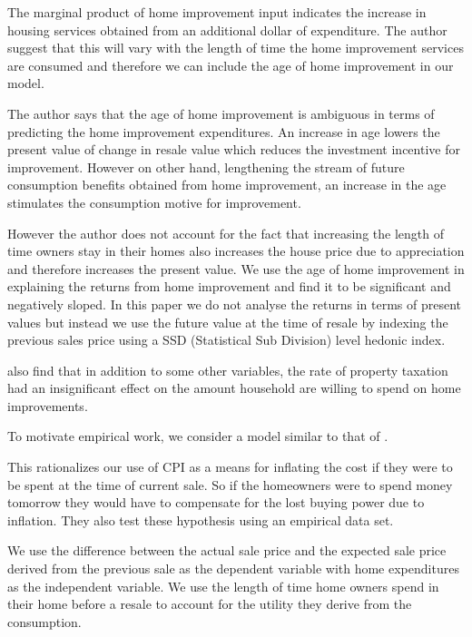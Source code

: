The marginal product of home improvement input indicates the increase in housing services obtained from an additional dollar of expenditure. The author suggest that this will vary with the length of time the home improvement services are consumed and therefore we can include the age of home improvement in our model.

The author says that the age of home improvement is ambiguous in terms of predicting the home improvement expenditures. An increase in age lowers the present value of change in resale value which reduces the investment incentive for improvement. However on other hand, lengthening the stream of future consumption benefits obtained from home improvement, an increase in the age stimulates the consumption motive for improvement.

However the author does not account for the fact that increasing the length of time owners stay in their homes also increases the house price due to appreciation and therefore increases the present value. We use the age of home improvement in explaining the returns from home improvement and find it to be significant and negatively sloped. In this paper we do not analyse the returns in terms of present values but instead we use the future value at the time of resale by indexing the previous sales price using a SSD (Statistical Sub Division) level hedonic index.

\citet{boehm1986improvement} also find that in addition to some other variables, the rate of property taxation had an insignificant effect on the amount household are willing to spend on home improvements.

To motivate empirical work, we consider a model similar to that of \citet{boehm1986improvement}.


This rationalizes our use of CPI as a means for inflating the cost if they were to be spent at the time of current sale. So if the homeowners were to spend money tomorrow they would have to compensate for the lost buying power due to inflation. They also test these hypothesis using an empirical data set.


We use the difference between the actual sale price and the expected sale price derived from the previous sale as the dependent variable with home expenditures as the independent variable. We use the length of time home owners spend in their home before a resale to account for the utility they derive from the consumption.



